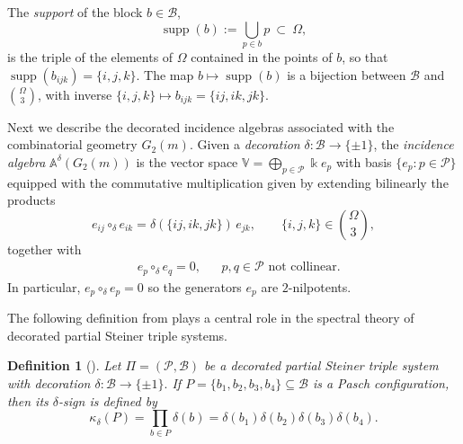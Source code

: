 \documentclass[10pt,a4paper]{amsart}
\newtheorem{definition}[theorem]{Definition}
\numberwithin{equation}{section}
\newcommand\fie{\Bbbk}
\def\alg{\mathbb{A}}
\def\valg{\mathbb{V}}
\DeclareMathOperator{\supp}{supp}
\begin{document}
The \emph{support} of the block $b\in\mathcal B$,
\begin{equation}\label{eq:suppdef}
\supp(b):=\bigcup_{p\in b}p\ \subset\ \Omega,
\end{equation}
is the triple of the elements of $\Omega$ contained in the points of $b$, so that $\supp(b_{ijk}) = \{i,j,k\}$. The map $b\mapsto\supp(b)$ is a bijection between $\mathcal B$ and $\binom{\Omega}{3}$, with inverse $\{i,j,k\}\mapsto b_{ijk} = \{ij,ik,jk\}$.







Next we describe the decorated incidence algebras associated with the combinatorial geometry $G_2(m)$. Given a \textit{decoration} $\delta:\mathcal B\to\{\pm1\}$,
the \textit{incidence algebra} $\alg^\delta(G_2(m))$ is the vector space
$\valg=\bigoplus_{p\in\mathcal P}\fie e_p$ with basis
$\{e_p:p\in\mathcal P\}$ equipped with the commutative multiplication given by extending bilinearly the products
\begin{equation}\label{multiplication}
e_{ij}\circ_\delta e_{ik}
=
\delta(\{ij,ik,jk\})\,e_{jk},
\qquad
\{i,j,k\}\in\binom{\Omega}{3},
\end{equation}
together with
\begin{align}\label{multiplication2}
&e_p\circ_\delta e_q=0,& &p, q \in \mathcal P \text{ not collinear.}
\end{align}
In particular, $e_p\circ_\delta e_p = 0$ so the generators $e_p$ are $2$-nilpotents.





The following definition from \cite{Fox-Tka2026b} plays a central role in the spectral theory of decorated partial Steiner triple systems.

\begin{definition}[\cite{Fox-Tka2026b}]\label{def:paschsign}
Let $\Pi=(\mathcal P,\mathcal B)$ be a decorated partial Steiner triple system with decoration
$\delta:\mathcal B\to\{\pm1\}.$
If $P=\{b_1,b_2,b_3,b_4\}\subseteq\mathcal B$
is a Pasch configuration, then its \emph{$\delta$-sign} is defined by
\begin{equation}\label{kappaP}
\kappa_\delta(P)
=
\prod_{b\in P}\delta(b)
=
\delta(b_1)\delta(b_2)\delta(b_3)\delta(b_4).
\end{equation}
\end{definition}
\end{document}
